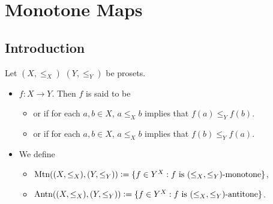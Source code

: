 \documentclass{book}
\begin{document}
	
	
	
	
	
	
	
	
	
	
	
	
	
	
	
	
	
	
	
	
	
	
	
	
	
	
	
	
	
	
	
	
	
	
	
	
	
	
	
	
	
	
	
	
	
	
	
	
	
	
	
	
	
	
	
	
	
	
	
	
	
	\newpage
	\chapter{Monotone Maps}
	
	\section{Introduction}
	
	\begin{defn} 
		Let $(X, \leq_X)$ $(Y, \leq_Y)$ be prosets.
		\begin{itemize}
			\item $f:X \rightarrow Y$. Then $f$ is said to be
			\begin{itemize}
				\item {} or  if for each $a,b \in X$, $a \leq_X b$ implies that $f(a) \leq_Y f(b)$. 
				\item {} or  if for each $a,b \in X$, $a \leq_X b$ implies that $f(b) \leq_Y f(a)$. 
			\end{itemize}
			\item We define 
			\begin{itemize}
				\item $\operatorname{\text{Mtn}}((X, \leq_X), (Y, \leq_Y)) \vcentcolon= \{f \in Y^X: \text{$f$ is $(\leq_X, \leq_Y)$-monotone}\}$,
				\item $\operatorname{\text{Antn}}((X, \leq_X), (Y, \leq_Y)) \vcentcolon= \{f \in Y^X: \text{$f$ is $(\leq_X, \leq_Y)$-antitone}\}$.
			\end{itemize}
		\end{itemize}
	\end{defn}
	
\end{document}

